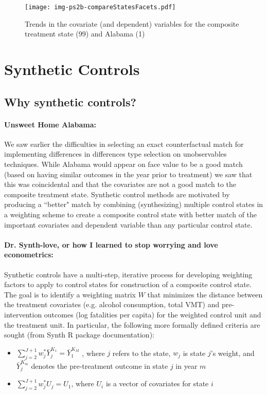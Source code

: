 \documentclass[letterpaper, 12pt]{article}
\begin{document}



\begin{figure}[htbp]
\begin{center}
\texttt{[image: img-ps2b-compareStatesFacets.pdf]}
\caption{Trends in the covariate (and dependent) variables for the composite treatment state (99) and Alabama (1)}
\label{fig:a22}
\end{center}
\end{figure}


\section{Synthetic Controls}

\subsection{Why synthetic controls?}

\paragraph{Unsweet Home Alabama:}
We saw earlier the difficulties in selecting an exact counterfactual match for implementing differences in differences type selection on unobservables techniques.  While Alabama would appear on face value to be a good match (based on having similar outcomes in the year prior to treatment) we saw that this was coincidental and that the covariates are not a good match to the composite treatment state.  Synthetic control methods are motivated by producing a ``better" match by combining (synthesizing) multiple control states in a weighting scheme to create a composite control state with better match of the important covariates and dependent variable than any particular control state.  

\paragraph{Dr. Synth-love, or how I learned to stop worrying and love econometrics:}
Synthetic controls have a multi-step, iterative process for developing weighting factors to apply to control states for construction of a composite control state.  The goal is to identify a weighting matrix $W$ that minimizes the distance between the treatment covariates (e.g. alcohol consumption, total VMT) and pre-intervention outcomes (log fatalities per capita) for the weighted control unit and the treatment unit. In particular, the following more formally defined criteria are sought (from Synth R package documentation):
\begin{itemize}
\item $\sum_{j=2}^{J+1} w_j^* \bar{Y}_j^{K_1} = \bar{Y}_1^{K_M}$ , where $j$ refers to the state, $w_j$ is state $j$'s weight, and $\bar{Y}_j^{K_m}$ denotes the pre-treatment outcome in state $j$ in year $m$
\item $\sum_{j=2}^{J+1} w_j^* U_j = U_1$, where $U_i$ is a vector of covariates for state $i$
\end{itemize}
\end{document}
